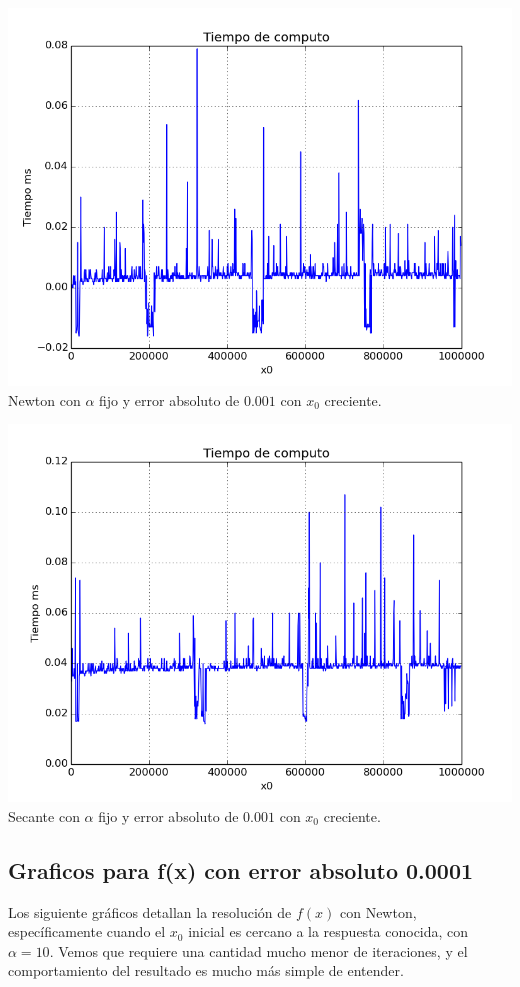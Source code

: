 \begin{center}
\includegraphics[scale=0.5]{graficos/tiempo-f-newton-alfa_fijo-absoluto-0.001-alejando.png}\\
Newton con $\alpha$ fijo y error absoluto de $0.001$ con $x_0$ creciente.
\end{center}

\begin{center}
\includegraphics[scale=0.5]{graficos/tiempo-f-secante-alfa_fijo-absoluto-0.001-alejando.png}\\
Secante con $\alpha$ fijo y error absoluto de $0.001$ con $x_0$ creciente.
\end{center}

\subsection{Graficos para f(x) con error absoluto 0.0001}
Los siguiente gráficos detallan la resolución de $f(x)$ con Newton, específicamente cuando el $x_0$ inicial es cercano a la respuesta conocida, con $\alpha = 10$. Vemos que requiere una cantidad mucho menor de iteraciones, y el comportamiento del resultado es mucho más simple de entender.


